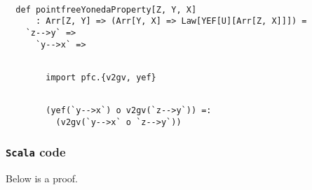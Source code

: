 \documentclass[11pt]{article}
\newcommand{\code}{\subsubsection{{\tt Scala} code}\begingroup\rm \vspace{12pt}}
\def\edefn{\endgroup\par\pagebreak[2]\addvspace{\medskipamount}}
\let\ecode=\edefn
\begin{document}
\vspace{6pt}
\begin{mdframed}[backgroundcolor=lightgray!20] 
\begin{lstlisting}

  def pointfreeYonedaProperty[Z, Y, X]
      : Arr[Z, Y] => (Arr[Y, X] => Law[YEF[U][Arr[Z, X]]]) =
    `z-->y` =>
      `y-->x` =>
\end{lstlisting}
\end{mdframed}
\vspace{6pt}
\begin{mdframed}[backgroundcolor=lightgray!20] 
\begin{lstlisting}

        import pfc.{v2gv, yef}
\end{lstlisting}
\end{mdframed}
\vspace{6pt}
\begin{mdframed}[backgroundcolor=lightgray!20] 
\begin{lstlisting}

        (yef(`y-->x`) o v2gv(`z-->y`)) =:
          (v2gv(`y-->x` o `z-->y`))
\end{lstlisting}
\end{mdframed}   
\ecode

\code
Below is a proof.
\end{document}
